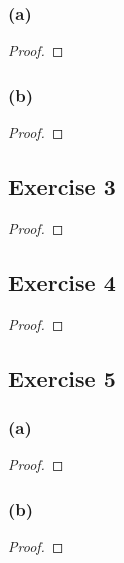 \documentclass[14pt]{extarticle}
\begin{document}
\subsubsection{(a)}

\begin{proof}

\end{proof}

\subsubsection{(b)}

\begin{proof}

\end{proof}

\subsection{Exercise 3}

\begin{proof}

\end{proof}

\subsection{Exercise 4}

\begin{proof}

\end{proof}

\subsection{Exercise 5}

\subsubsection{(a)}

\begin{proof}

\end{proof}

\subsubsection{(b)}

\begin{proof}

\end{proof}
\end{document}
